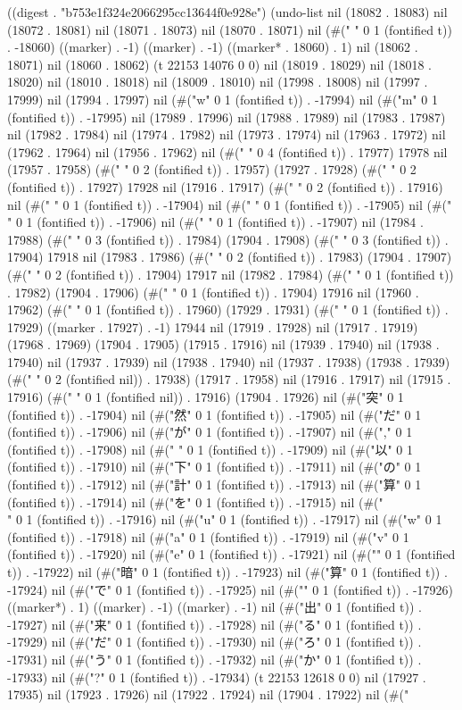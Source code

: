 
((digest . "b753e1f324e2066295cc13644f0e928e") (undo-list nil (18082 . 18083) nil (18072 . 18081) nil (18071 . 18073) nil (18070 . 18071) nil (#("
" 0 1 (fontified t)) . -18060) ((marker) . -1) ((marker) . -1) ((marker* . 18060) . 1) nil (18062 . 18071) nil (18060 . 18062) (t 22153 14076 0 0) nil (18019 . 18029) nil (18018 . 18020) nil (18010 . 18018) nil (18009 . 18010) nil (17998 . 18008) nil (17997 . 17999) nil (17994 . 17997) nil (#("w" 0 1 (fontified t)) . -17994) nil (#("m" 0 1 (fontified t)) . -17995) nil (17989 . 17996) nil (17988 . 17989) nil (17983 . 17987) nil (17982 . 17984) nil (17974 . 17982) nil (17973 . 17974) nil (17963 . 17972) nil (17962 . 17964) nil (17956 . 17962) nil (#("    " 0 4 (fontified t)) . 17977) 17978 nil (17957 . 17958) (#("  " 0 2 (fontified t)) . 17957) (17927 . 17928) (#("  " 0 2 (fontified t)) . 17927) 17928 nil (17916 . 17917) (#("  " 0 2 (fontified t)) . 17916) nil (#(" " 0 1 (fontified t)) . -17904) nil (#(" " 0 1 (fontified t)) . -17905) nil (#(" " 0 1 (fontified t)) . -17906) nil (#(" " 0 1 (fontified t)) . -17907) nil (17984 . 17988) (#("   " 0 3 (fontified t)) . 17984) (17904 . 17908) (#("   " 0 3 (fontified t)) . 17904) 17918 nil (17983 . 17986) (#("  " 0 2 (fontified t)) . 17983) (17904 . 17907) (#("  " 0 2 (fontified t)) . 17904) 17917 nil (17982 . 17984) (#(" " 0 1 (fontified t)) . 17982) (17904 . 17906) (#(" " 0 1 (fontified t)) . 17904) 17916 nil (17960 . 17962) (#(" " 0 1 (fontified t)) . 17960) (17929 . 17931) (#(" " 0 1 (fontified t)) . 17929) ((marker . 17927) . -1) 17944 nil (17919 . 17928) nil (17917 . 17919) (17968 . 17969) (17904 . 17905) (17915 . 17916) nil (17939 . 17940) nil (17938 . 17940) nil (17937 . 17939) nil (17938 . 17940) nil (17937 . 17938) (17938 . 17939) (#("  " 0 2 (fontified nil)) . 17938) (17917 . 17958) nil (17916 . 17917) nil (17915 . 17916) (#(" " 0 1 (fontified nil)) . 17916) (17904 . 17926) nil (#("突" 0 1 (fontified t)) . -17904) nil (#("然" 0 1 (fontified t)) . -17905) nil (#("だ" 0 1 (fontified t)) . -17906) nil (#("が" 0 1 (fontified t)) . -17907) nil (#("," 0 1 (fontified t)) . -17908) nil (#(" " 0 1 (fontified t)) . -17909) nil (#("以" 0 1 (fontified t)) . -17910) nil (#("下" 0 1 (fontified t)) . -17911) nil (#("の" 0 1 (fontified t)) . -17912) nil (#("計" 0 1 (fontified t)) . -17913) nil (#("算" 0 1 (fontified t)) . -17914) nil (#("を" 0 1 (fontified t)) . -17915) nil (#("\\" 0 1 (fontified t)) . -17916) nil (#("u" 0 1 (fontified t)) . -17917) nil (#("w" 0 1 (fontified t)) . -17918) nil (#("a" 0 1 (fontified t)) . -17919) nil (#("v" 0 1 (fontified t)) . -17920) nil (#("e" 0 1 (fontified t)) . -17921) nil (#("{" 0 1 (fontified t)) . -17922) nil (#("暗" 0 1 (fontified t)) . -17923) nil (#("算" 0 1 (fontified t)) . -17924) nil (#("で" 0 1 (fontified t)) . -17925) nil (#("}" 0 1 (fontified t)) . -17926) ((marker*) . 1) ((marker) . -1) ((marker) . -1) nil (#("出" 0 1 (fontified t)) . -17927) nil (#("来" 0 1 (fontified t)) . -17928) nil (#("る" 0 1 (fontified t)) . -17929) nil (#("だ" 0 1 (fontified t)) . -17930) nil (#("ろ" 0 1 (fontified t)) . -17931) nil (#("う" 0 1 (fontified t)) . -17932) nil (#("か" 0 1 (fontified t)) . -17933) nil (#("?" 0 1 (fontified t)) . -17934) (t 22153 12618 0 0) nil (17927 . 17935) nil (17923 . 17926) nil (17922 . 17924) nil (17904 . 17922) nil (#("

